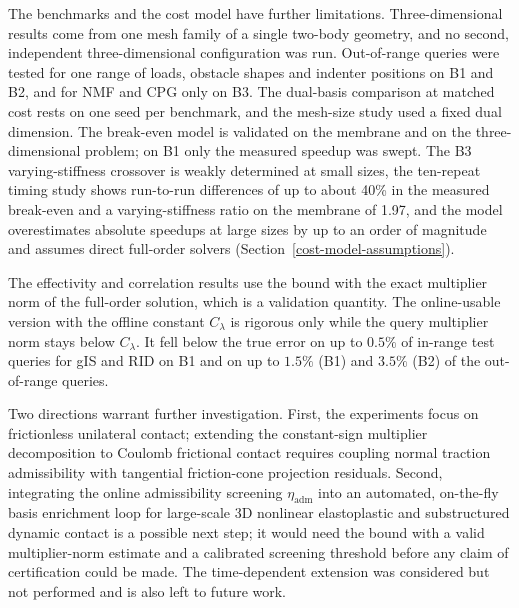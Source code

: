 \documentclass[11pt,a4paper]{article}
\begin{document}
The benchmarks and the cost model have further limitations. Three-dimensional results come from one mesh family of a single two-body geometry, and no second, independent three-dimensional configuration was run. Out-of-range queries were tested for one range of loads, obstacle shapes and indenter positions on B1 and B2, and for NMF and CPG only on B3. The dual-basis comparison at matched cost rests on one seed per benchmark, and the mesh-size study used a fixed dual dimension. The break-even model is validated on the membrane and on the three-dimensional problem; on B1 only the measured speedup was swept. The B3 varying-stiffness crossover is weakly determined at small sizes, the ten-repeat timing study shows run-to-run differences of up to about 40\% in the measured break-even and a varying-stiffness ratio on the membrane of 1.97, and the model overestimates absolute speedups at large sizes by up to an order of magnitude and assumes direct full-order solvers (Section~\ref{cost-model-assumptions}).

The effectivity and correlation results use the bound with the exact multiplier norm of the full-order solution, which is a validation quantity. The online-usable version with the offline constant \(C_\lambda\) is rigorous only while the query multiplier norm stays below \(C_\lambda\). It fell below the true error on up to \(0.5\%\) of in-range test queries for gIS and RID on B1 and on up to \(1.5\%\) (B1) and \(3.5\%\) (B2) of the out-of-range queries.

Two directions warrant further investigation. First, the experiments focus on frictionless unilateral contact; extending the constant-sign multiplier decomposition to Coulomb frictional contact \cite{niakh2024reduced} requires coupling normal traction admissibility with tangential friction-cone projection residuals. Second, integrating the online admissibility screening \(\eta_{\text{adm}}\) into an automated, on-the-fly basis enrichment loop for large-scale 3D nonlinear elastoplastic and substructured dynamic contact \cite{koller2021hyper, aresdeparga2023petrov, manvelyan2026inference} is a possible next step; it would need the bound with a valid multiplier-norm estimate and a calibrated screening threshold before any claim of certification could be made. The time-dependent extension was considered but not performed and is also left to future work.


{\small

 }
\end{document}
